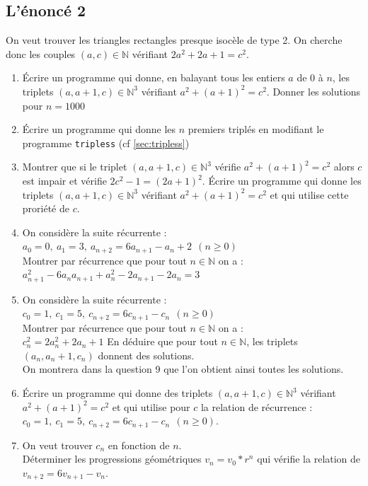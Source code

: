 \documentclass[a4paper,11pt]{book}
\newcommand{\N}{{\mathbb{N}}}
\begin{document}
\subsection{L'\'enonc\'e 2}
On veut trouver les triangles rectangles presque isoc\`ele de type 2.
On cherche donc les couples $(a,c)\in \N$ v\'erifiant $2a^2+2a+1=c^2$.\\
 \begin{enumerate}
\item \'Ecrire un programme qui donne, en balayant tous les entiers $a$ de 0 
\`a $n$, les triplets $(a,a+1,c)\in \N^3$ v\'erifiant $a^2+(a+1)^2=c^2$.
Donner les solutions pour $n=1000$
\item \'Ecrire un programme qui donne les $n$ premiers tripl\'es en modifiant le programme {\tt tripless} (cf \ref{sec:tripless})
\item Montrer que si le triplet $(a,a+1,c)\in \N^3$ v\'erifie $a^2+(a+1)^2=c^2$
alors $c$ est impair et v\'erifie $2c^2-1=(2a+1)^2$.
\'Ecrire un programme qui donne les triplets $(a,a+1,c)\in \N^3$ v\'erifiant $a^2+(a+1)^2=c^2$ et qui utilise cette prori\'et\'e de $c$.
\item On consid\`ere la suite r\'ecurrente :\\
$a_0=0,\ a_1=3,\ a_{n+2}=6a_{n+1}-a_n+2\ \  (n\geq 0)$\\
Montrer par r\'ecurrence que pour tout $n\in \N$ on a :\\
$a_{n+1}^2-6a_na_{n+1}+a_n^2-2a_{n+1}-2a_n=3$
\item On consid\`ere la suite r\'ecurrente :\\
$c_0=1,\ c_1=5,\ c_{n+2}=6c_{n+1}-c_n\ \  (n\geq 0)$\\
Montrer par r\'ecurrence que pour tout $n\in \N$ on a :\\
$c_n^2=2a_n^2+2a_n+1$
 En d\'eduire que pour tout $n\in \N$, les triplets $(a_n,a_n+1,c_n)$ 
donnent des solutions.\\
On montrera dans la question 9 que l'on obtient ainsi toutes les solutions.
\item \'Ecrire un programme qui donne des triplets $(a,a+1,c)\in \N^3$ 
v\'erifiant $a^2+(a+1)^2=c^2$ et qui utilise pour $c$ la relation de 
r\'ecurrence :\\
$c_0=1,\ c_1=5,\ c_{n+2}=6c_{n+1}-c_n\ \  (n\geq 0)$.
\item On veut trouver $c_n$  en fonction de $n$.\\
D\'eterminer les progressions g\'eom\'etriques $v_n=v_0*r^n$ qui v\'erifie la 
relation de $v_{n+2}=6v_{n+1}-v_n$.\\

\end{enumerate}
\end{document}
